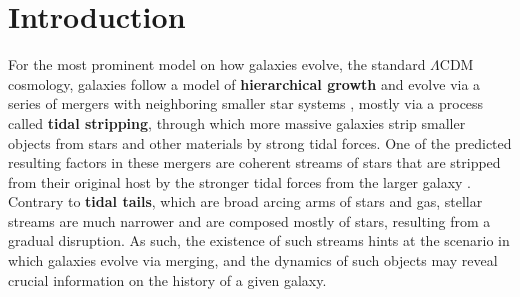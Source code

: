 \documentclass[linenumbers,trackchanges]{aastex7}
\begin{document}

\section{Introduction} \label{sec:introduction}

For the most prominent model on how galaxies evolve, the standard $\Lambda$CDM cosmology, galaxies follow a model of \textbf{hierarchical growth} and evolve via a series of mergers with neighboring smaller star systems \citep{Johnston2008-bz}, mostly via a process called \textbf{tidal stripping}, through which more massive galaxies strip smaller objects from stars and other materials by strong tidal forces. One of the predicted resulting factors in these mergers are coherent streams of stars that are stripped from their original host by the stronger tidal forces from the larger galaxy \citep{Jensen2021-mw}. Contrary to \textbf{tidal tails}, which are broad arcing arms of stars and gas, stellar streams are much narrower and are composed mostly of stars, resulting from a gradual disruption. As such, the existence of such streams hints at the scenario in which galaxies evolve via merging, and the dynamics of such objects may reveal crucial information on the history of a given galaxy.
\end{document}
